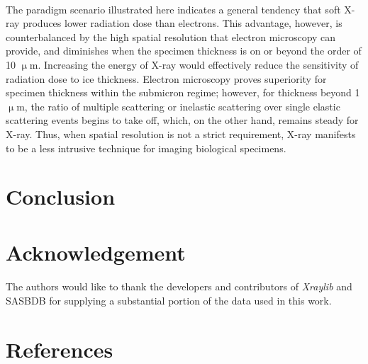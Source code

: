 \documentclass[review]{elsarticle}
\newcommand\micron{$\upmu$m}
\begin{document}
\paragraph{} The paradigm scenario illustrated here indicates a general tendency that soft X-ray produces lower radiation dose than electrons. This advantage, however, is counterbalanced by the high spatial resolution that electron microscopy can provide, and diminishes when the specimen thickness is on or beyond the order of 10 \micron. Increasing the energy of X-ray would effectively reduce the sensitivity of radiation dose to ice thickness. Electron microscopy proves superiority for specimen thickness within the submicron regime; however, for thickness beyond 1 \micron, the ratio of multiple scattering or inelastic scattering over single elastic scattering events begins to take off, which, on the other hand, remains steady for X-ray. Thus, when spatial resolution is not a strict requirement, X-ray manifests to be a less intrusive technique for imaging biological specimens. 

\section{Conclusion}

\section{Acknowledgement}
\paragraph{} The authors would like to thank the developers and contributors of \textit{Xraylib} and SASBDB for supplying a substantial portion of the data used in this work. 

\section*{References}

{}
\end{document}
